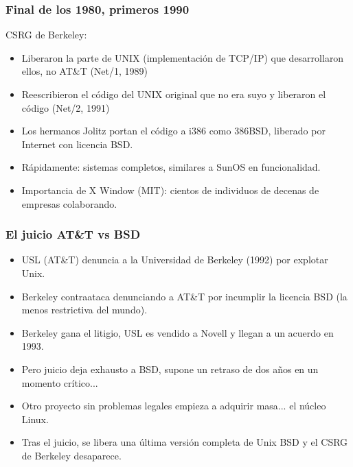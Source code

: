 \documentclass{beamer}
\begin{document}

\begin{frame}
\frametitle{Final de los 1980, primeros 1990}

CSRG de Berkeley:
\begin{itemize}
\item Liberaron la parte de UNIX (implementación de TCP/IP) que desarrollaron ellos, no AT\&T (Net/1, 1989)
\item Reescribieron el código del UNIX original que no era suyo y liberaron el código (Net/2, 1991)
\item Los hermanos Jolitz portan el código a i386 como 386BSD, liberado por Internet con licencia BSD.
\item Rápidamente: sistemas completos, similares a SunOS en funcionalidad.
\item Importancia de X Window (MIT): cientos de individuos de decenas de empresas colaborando.

\end{itemize}

\end{frame}



\begin{frame}
\frametitle{El juicio AT\&T vs BSD}

\begin{itemize}
\item USL (AT\&T) denuncia a la Universidad de Berkeley (1992) por explotar Unix.
\item Berkeley contraataca denunciando a AT\&T por incumplir la licencia BSD (la menos restrictiva del mundo).
\item Berkeley gana el litigio, USL es vendido a Novell y llegan a un acuerdo en 1993.
\item Pero juicio deja exhausto a BSD, supone un retraso de dos años en un momento crítico...
\item Otro proyecto sin problemas legales empieza a adquirir masa... el núcleo Linux.
\item Tras el juicio, se libera una última versión completa de Unix BSD y el CSRG de Berkeley desaparece.

\end{itemize}

\end{frame}

\end{document}
